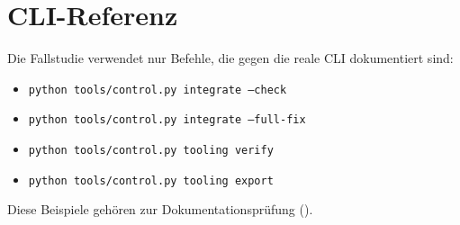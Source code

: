 \section{CLI-Referenz}
\label{app:cli-reference}

Die Fallstudie verwendet nur Befehle, die gegen die reale CLI dokumentiert sind:
\begin{itemize}
  \item \texttt{python tools/control.py integrate --check}
  \item \texttt{python tools/control.py integrate --full-fix}
  \item \texttt{python tools/control.py tooling verify}
  \item \texttt{python tools/control.py tooling export}
\end{itemize}
Diese Beispiele gehören zur
\Verified{} Dokumentationsprüfung ().
